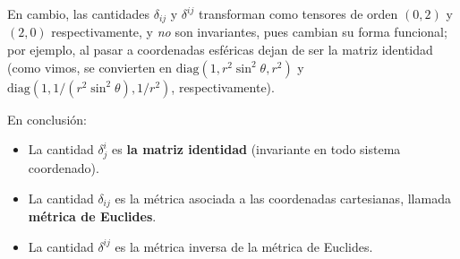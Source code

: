En cambio, las cantidades $\delta_{ij}$ y $\delta^{ij}$ transforman como tensores de orden $(0,2)$ y $(2,0)$ respectivamente, y \emph{no} son invariantes, pues cambian su forma funcional; por ejemplo, al pasar a coordenadas esféricas dejan de ser la matriz identidad (como vimos, se convierten en $\mathrm{diag}(1,r^2\sin^2\theta,r^2)$ y $\mathrm{diag}(1,1/(r^2\sin^2\theta),1/r^2)$, respectivamente).

En conclusión:
\begin{itemize}
\item La cantidad $\delta^i_j$ es \textbf{la matriz identidad} (invariante en todo sistema coordenado).
\item La cantidad $\delta_{ij}$ es la métrica asociada a las coordenadas cartesianas, llamada \textbf{métrica de Euclides}.
\item La cantidad $\delta^{ij}$ es la métrica inversa de la métrica de Euclides.
\end{itemize}
